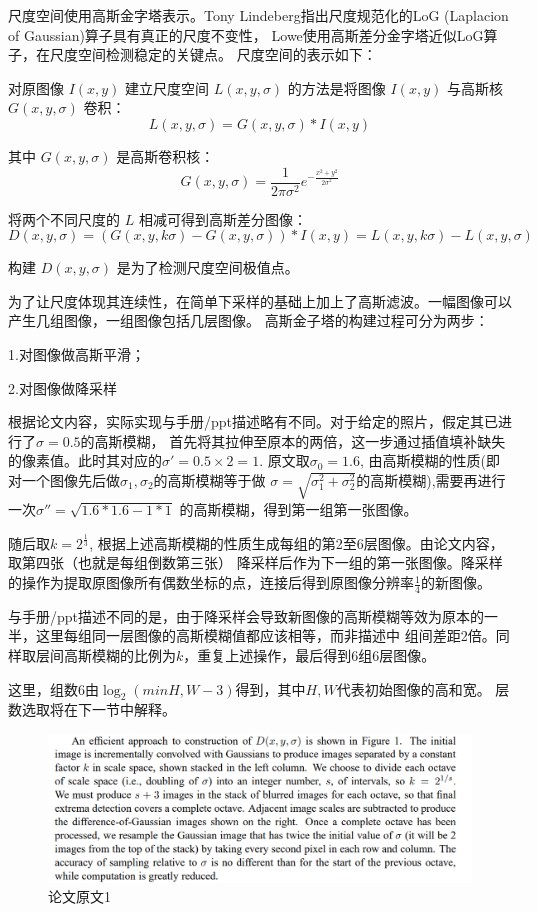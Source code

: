 \documentclass{article}
\begin{document}
    尺度空间使用高斯金字塔表示。Tony Lindeberg指出尺度规范化的LoG
    (Laplacion of Gaussian)算子具有真正的尺度不变性，
    Lowe使用高斯差分金字塔近似LoG算子，在尺度空间检测稳定的关键点。
    尺度空间的表示如下：

对原图像 \( I(x, y) \) 建立尺度空间 \( L(x, y, \sigma) \) 的方法是将图像 \( I(x, y) \) 与高斯核 \( G(x, y, \sigma) \) 卷积：
\[
L(x, y, \sigma) = G(x, y, \sigma) * I(x, y)
\]

其中 \( G(x, y, \sigma) \) 是高斯卷积核：
\[
G(x, y, \sigma) = \frac{1}{2\pi\sigma^2} e^{-\frac{x^2 + y^2}{2\sigma^2}}
\]

将两个不同尺度的 \( L \) 相减可得到高斯差分图像：
\[
D(x, y, \sigma) = (G(x, y, k\sigma) - G(x, y, \sigma)) * I(x, y)
= L(x, y, k\sigma) - L(x, y, \sigma)
\]

构建 \( D(x, y, \sigma) \) 是为了检测尺度空间极值点。

    为了让尺度体现其连续性，在简单下采样的基础上加上了高斯滤波。一幅图像可以产生几组图像，一组图像包括几层图像。
    高斯金子塔的构建过程可分为两步：

    1.对图像做高斯平滑；

    2.对图像做降采样

    根据论文内容，实际实现与手册/ppt描述略有不同。对于给定的照片，假定其已进行了\(\sigma = 0.5\)的高斯模糊，
    首先将其拉伸至原本的两倍，这一步通过插值填补缺失的像素值。此时其对应的\(\sigma' =  0.5 \times 2 = 1\).
    原文取\(\sigma_0 = 1.6\), 由高斯模糊的性质(即对一个图像先后做\(\sigma_1, \sigma_2\)的高斯模糊等于做
    \(\sigma = \sqrt{\sigma_1^2 + \sigma_2^2}\)的高斯模糊),需要再进行一次\(\sigma'' = \sqrt{1.6 * 1.6 - 1 * 1}\)
    的高斯模糊，得到第一组第一张图像。

    随后取\(k = 2^{\frac{1}{3}}\), 根据上述高斯模糊的性质生成每组的第2至6层图像。由论文内容，取第四张（也就是每组倒数第三张）
    降采样后作为下一组的第一张图像。降采样的操作为提取原图像所有偶数坐标的点，连接后得到原图像分辨率\(\frac{1}{4}\)的新图像。

    与手册/ppt描述不同的是，由于降采样会导致新图像的高斯模糊等效为原本的一半，这里每组同一层图像的高斯模糊值都应该相等，而非描述中
    组间差距2倍。同样取层间高斯模糊的比例为\(k\)，重复上述操作，最后得到6组6层图像。

    这里，组数6由\(\log_2(min{H, W} - 3)\)得到，其中\(H, W\)代表初始图像的高和宽。
    层数选取将在下一节中解释。

\begin{figure}[h]
\centering
\includegraphics[width=1\textwidth]{./others/a1}
\caption{论文原文1}
\end{figure}
\end{document}
